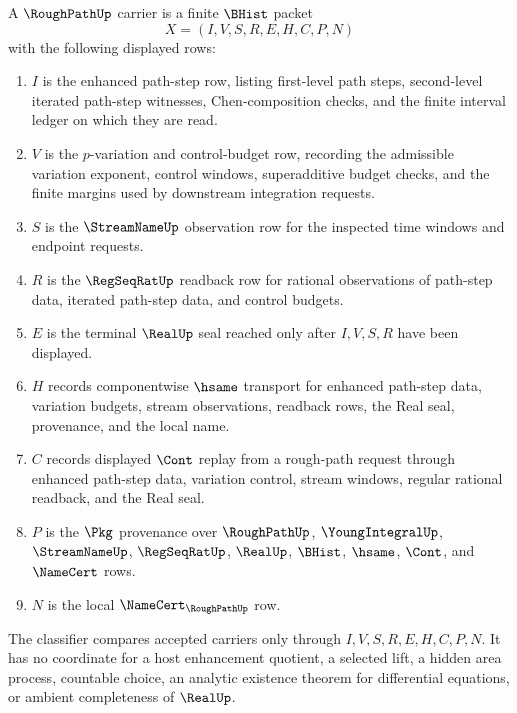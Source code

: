 \begin{definition}
\label{def:rough-path-carrier}
A $\RoughPathUp$ carrier is a finite $\BHist$ packet
$$
X=(I,V,S,R,E,H,C,P,N)
$$
with the following displayed rows:
\begin{enumerate}
\item $I$ is the enhanced path-step row, listing first-level path steps, second-level iterated path-step witnesses, Chen-composition checks, and the finite interval ledger on which they are read.
\item $V$ is the $p$-variation and control-budget row, recording the admissible variation exponent, control windows, superadditive budget checks, and the finite margins used by downstream integration requests.
\item $S$ is the $\StreamNameUp$ observation row for the inspected time windows and endpoint requests.
\item $R$ is the $\RegSeqRatUp$ readback row for rational observations of path-step data, iterated path-step data, and control budgets.
\item $E$ is the terminal $\RealUp$ seal reached only after $I,V,S,R$ have been displayed.
\item $H$ records componentwise $\hsame$ transport for enhanced path-step data, variation budgets, stream observations, readback rows, the Real seal, provenance, and the local name.
\item $C$ records displayed $\Cont$ replay from a rough-path request through enhanced path-step data, variation control, stream windows, regular rational readback, and the Real seal.
\item $P$ is the $\Pkg$ provenance over $\RoughPathUp$, $\YoungIntegralUp$, $\StreamNameUp$, $\RegSeqRatUp$, $\RealUp$, $\BHist$, $\hsame$, $\Cont$, and $\NameCert$ rows.
\item $N$ is the local $\NameCert_{\RoughPathUp}$ row.
\end{enumerate}
The classifier compares accepted carriers only through $I,V,S,R,E,H,C,P,N$. It has no coordinate for a host enhancement quotient, a selected lift, a hidden area process, countable choice, an analytic existence theorem for differential equations, or ambient completeness of $\RealUp$.
\end{definition}

